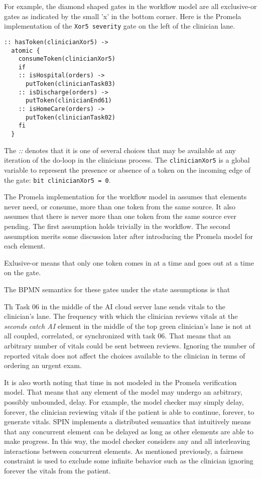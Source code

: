 For example, the diamond shaped gates in the workflow model are all exclusive-or gates as indicated by the small 'x' in the bottom corner. Here is the Promela implementation of the \texttt{Xor5 severity} gate on the left of the clinician lane.
%
{\small
\begin{lstlisting}[style=myPromela]
:: hasToken(clinicianXor5) ->
  atomic {
    consumeToken(clinicianXor5)
    if
    :: isHospital(orders) ->
      putToken(clinicianTask03)
    :: isDischarge(orders) ->
      putToken(clinicianEnd61)
    :: isHomeCare(orders) ->
      putToken(clinicianTask02)
    fi
  }
\end{lstlisting}
}
% 
\noindent The \emph{::} denotes that it is one of several choices that may be available at any iteration of the do-loop in the clinicians process. The \texttt{clinicianXor5} is a global variable to represent the presence or absence of a token on the incoming edge of the gate: \texttt{bit clinicianXor5 = 0}. 


The Promela implementation for the workflow model in  assumes that elements never need, or consume, more than one token from the same source. It also assumes that there is never more than one token from the same source ever pending. The first assumption holds trivially in the workflow. The second assumption merits some discussion later after introducing the Promela model for each element. 


Exlusive-or means that only one token comes in at a time and goes out at a time on the gate.

The BPMN semantics for these gates under the state assumptions is that 


Th
Task 06 in the middle of the AI cloud server lane sends vitals to the clinician's lane. The frequency with which the clinician reviews vitals at the \emph{seconds catch AI} element in the middle of the top green clinician's lane is not at all coupled, correlated, or synchronized with task 06. That means that an arbitrary number of vitals could be sent between reviews. Ignoring the number of reported vitals does not affect the choices available to the clinician in terms of ordering an urgent exam.



It is also worth noting that time in not modeled in the Promela verification model. That means that any element of the model may undergo an arbitrary, possibly unbounded, delay. For example, the model checker may simply delay, forever, the clinician reviewing vitals if the patient is able to continue, forever, to generate vitals. SPIN implements a distributed semantics that intuitively means that any concurrent element can be delayed as long as other elements are able to make progress. In this way, the model checker considers any and all interleaving interactions between concurrent elements. As mentioned previously, a fairness constraint is used to exclude some infinite behavior such as the clinician ignoring forever the vitals from the patient.



